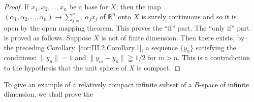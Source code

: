 \begin{proof}
 If $x_{1}, x_{2}, \ldots, x_{n}$ be a base for $X$, then the map $(\alpha_{1}, \alpha_{2}, \ldots, \alpha_{n}) \to \sum\limits_{j=1}^{n} \alpha_{j} x_{j}$ of $\mathbb{R}^{n}$ onto $X$ is surely continuous and so it is open by the open mapping theorem. This proves the ``if'' part. The ``only if'' part is proved as follows. Suppose $X$ is not of finite dimension. Then there exists, by the preceding Corollary~\ref{cor:III.2.Corollary.1}, a sequence $\{y_{n}\}$ satisfying the conditions: $\|y_{n}\|=1$ and $\|y_{m}-y_{n}\|\geqq1/2$ for $m>n$. This is a contradiction to the hypothesis that the unit sphere of $X$ is compact. 
\end{proof}


\label{sec:III.3}

To give an example of a relatively compact infinite subset of a $B$-space of infinite dimension, we shall prove the 

